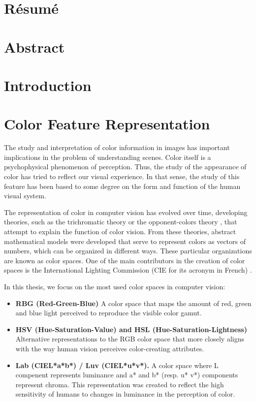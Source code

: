\section*{Résumé}
\noindent 

\section*{Abstract}
\noindent 

\section{Introduction}

\section{Color Feature Representation}
The study and interpretation of color information in images has important implications in the problem of understanding scenes. Color itself is a psychophysical phenomenon of perception. Thus, the study of the appearance of color has tried to reflect our visual experience. In that sense, the study of this feature has been based to some degree on the form and function of the human visual system.

The representation of color in computer vision has evolved over time, developing theories, such as the trichromatic theory or the opponent-colors theory \citep{Fairchild:Book:2005}, that attempt to explain the function of color vision. From these theories, abstract mathematical models were developed that serve to represent colors as vectors of numbers, which can be organized in different ways. These particular organizations are known as color spaces. One of the main contributors in the creation of color spaces is the International Lighting Commission (CIE for its acronym in French) \citep{Wright:BookCh2:2007}.

In this thesis, we focus on the most used color spaces in computer vision:
\begin{itemize}
	\item \textbf{RBG (Red-Green-Blue)} A color space that maps the amount of red, green and blue light perceived to reproduce the visible color gamut.
	\item \textbf{HSV (Hue-Saturation-Value) and HSL (Hue-Saturation-Lightness)} Alternative representations to the RGB color space that more closely aligns with the way human vision perceives color-creating attributes.
	\item \textbf{Lab (CIEL*a*b*) / Luv (CIEL*u*v*).} A color space where L compenent represents luminance and a* and b* (resp. u* v*) components represent chroma. This representation was created to reflect the high sensitivity of humans to changes in luminance in the perception of color.
\end{itemize}


